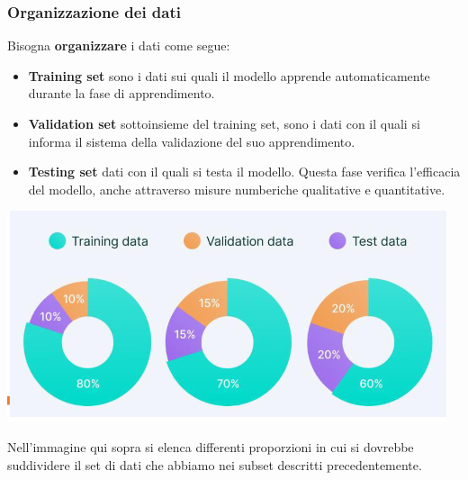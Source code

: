 \subsubsection{Organizzazione dei dati}
Bisogna \textbf{organizzare} i dati come segue: 
\begin{itemize}
    \item \textbf{Training set} sono i dati sui quali il modello 
%
    apprende automaticamente durante la fase di apprendimento.
    \item \textbf{Validation set} sottoinsieme del training set, 
%
    sono i dati con il quali si informa il sistema della 
%
    validazione del suo apprendimento.
    \item \textbf{Testing set} dati con il quali si testa il 
%
    modello. Questa fase verifica l'efficacia del modello, anche
%
    attraverso misure numberiche qualitative e quantitative.
\end{itemize}
\begin{center}
    \includegraphics[scale=0.7]{images/Organizzazione_dei_dati.png}
\end{center}
Nell'immagine qui sopra si elenca differenti proporzioni in cui 
%
si dovrebbe suddividere il set di dati che abbiamo nei subset 
%
descritti precedentemente.

